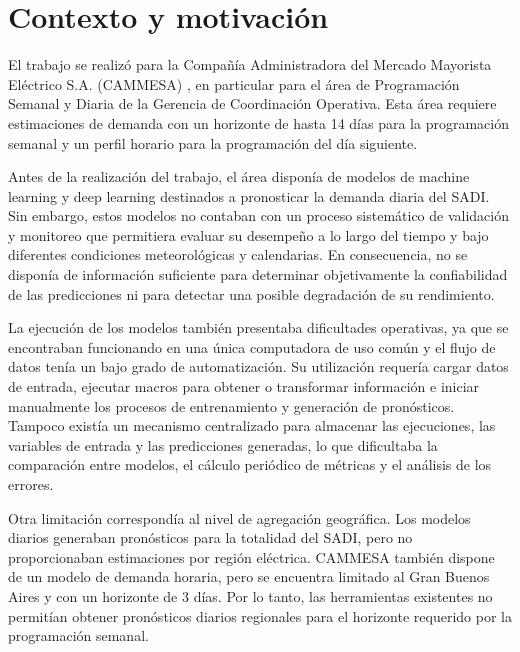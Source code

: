 

\section{Contexto y motivación}
\label{sec:contexto_motivacion}

El trabajo se realizó para la Compañía Administradora del Mercado Mayorista Eléctrico S.A. (CAMMESA) \cite{decreto1192,cammesaEmpresa}, en particular para el área de Programación Semanal y Diaria de la Gerencia de Coordinación Operativa. Esta área requiere estimaciones de demanda con un horizonte de hasta 14 días para la programación semanal y un perfil horario para la programación del día siguiente.

Antes de la realización del trabajo, el área disponía de modelos de machine learning y deep learning destinados a pronosticar la demanda diaria del SADI. Sin embargo, estos modelos no contaban con un proceso sistemático de validación y monitoreo que permitiera evaluar su desempeño a lo largo del tiempo y bajo diferentes condiciones meteorológicas y calendarias. En consecuencia, no se disponía de información suficiente para determinar objetivamente la confiabilidad de las predicciones ni para detectar una posible degradación de su rendimiento.

La ejecución de los modelos también presentaba dificultades operativas, ya que se encontraban funcionando en una única computadora de uso común y el flujo de datos tenía un bajo grado de automatización. Su utilización requería cargar datos de entrada, ejecutar macros para obtener o transformar información e iniciar manualmente los procesos de entrenamiento y generación de pronósticos. Tampoco existía un mecanismo centralizado para almacenar las ejecuciones, las variables de entrada y las predicciones generadas, lo que dificultaba la comparación entre modelos, el cálculo periódico de métricas y el análisis de los errores.

Otra limitación correspondía al nivel de agregación geográfica. Los modelos diarios generaban pronósticos para la totalidad del SADI, pero no proporcionaban estimaciones por región eléctrica. CAMMESA también dispone de un modelo de demanda horaria, pero se encuentra limitado al Gran Buenos Aires y con un horizonte de 3 días. Por lo tanto, las herramientas existentes no permitían obtener pronósticos diarios regionales para el horizonte requerido por la programación semanal.

